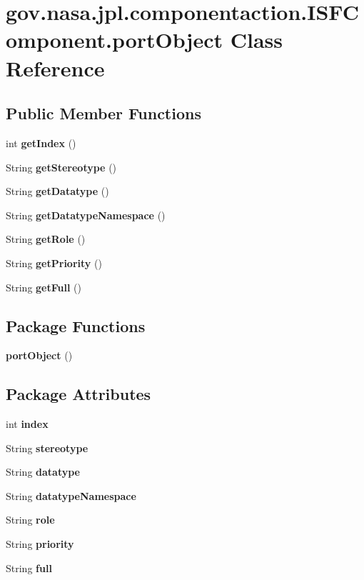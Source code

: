 \section{gov.\+nasa.\+jpl.\+componentaction.\+I\+S\+F\+Component.\+port\+Object Class Reference}
\label{classgov_1_1nasa_1_1jpl_1_1componentaction_1_1_i_s_f_component_1_1port_object}
\subsection*{Public Member Functions}
\begin{DoxyCompactItemize}
\item 
int {\bf get\+Index} ()
\item 
String {\bf get\+Stereotype} ()
\item 
String {\bf get\+Datatype} ()
\item 
String {\bf get\+Datatype\+Namespace} ()
\item 
String {\bf get\+Role} ()
\item 
String {\bf get\+Priority} ()
\item 
String {\bf get\+Full} ()
\end{DoxyCompactItemize}
\subsection*{Package Functions}
\begin{DoxyCompactItemize}
\item 
{\bf port\+Object} ()
\end{DoxyCompactItemize}
\subsection*{Package Attributes}
\begin{DoxyCompactItemize}
\item 
int {\bf index}
\item 
String {\bf stereotype}
\item 
String {\bf datatype}
\item 
String {\bf datatype\+Namespace}
\item 
String {\bf role}
\item 
String {\bf priority}
\item 
String {\bf full}
\end{DoxyCompactItemize}


